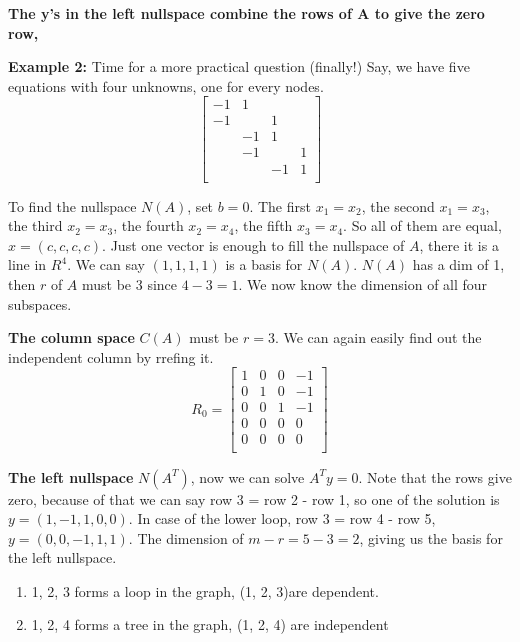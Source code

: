 \textbf{The y's in the left nullspace combine the rows of A to give the zero row,}

\textbf{Example 2:} Time for a more practical question (finally!) Say, we have five equations with four unknowns, one for every nodes. 
\[
    \begin{bmatrix}
        -1 & 1 &  &   \\
        -1 &  & 1 &   \\
         & -1 & 1 &   \\
         & -1 &  & 1  \\
         &  & -1 & 1  \\
    \end{bmatrix}
\]  

To find the nullspace \(N(A)\), set \(b = 0\). The first \(x_1 = x_2\), the second \(x_1 = x_3\), the third \(x_2 = x_3\), the fourth \(x_2 = x_4\), the fifth \(x_3 = x_4\). So all of them are equal, \(x = (c, c, c, c)\). Just one vector is enough to fill the nullspace of \(A\), there it is a line in \(R^4\). We can say \((1, 1, 1, 1)\) is a basis for \(N(A)\). \(N(A)\) has a dim of 1, then \(r\) of \(A\) must be 3 since \(4 - 3 = 1\). We now know the dimension of all four subspaces. 

\textbf{The column space}  \(C(A)\) must be \(r = 3\). We can again easily find out the independent column by rrefing it. 
\[
    R_0 =
    \begin{bmatrix}
        1 & 0 & 0 & -1  \\
        0 & 1 & 0 & -1  \\
        0 & 0 & 1 & -1  \\
        0 & 0 & 0 & 0  \\
        0 & 0 & 0 & 0  \\
    \end{bmatrix}
\]  

\textbf{The left nullspace} \(N(A^T)\), now we can solve \(A^{T}y = 0\). Note that the rows give zero, because of that we can say row 3 = row 2 - row 1, so one of the solution is \(y = (1, -1, 1, 0, 0)\). In case of the lower loop, row 3 = row 4 - row 5, \(y = (0, 0, -1, 1, 1)\). The dimension of \(m - r = 5 - 3 = 2\), giving us the basis for the left nullspace. 

\begin{enumerate}
    \item 1, 2, 3 forms a loop in the graph, (1, 2, 3)are dependent. 
    \item 1, 2, 4 forms a tree in the graph, (1, 2, 4) are independent
\end{enumerate}

